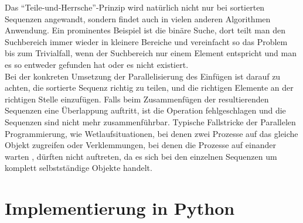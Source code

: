 \par
Das "`Teile-und-Herrsche"'-Prinzip wird natürlich nicht nur bei sortierten Sequenzen angewandt, sondern findet auch in vielen anderen Algorithmen Anwendung. Ein prominentes Beispiel ist die binäre Suche, dort teilt man den Suchbereich immer wieder in kleinere Bereiche und vereinfacht so das Problem bis zum Trivialfall, wenn der Suchbereich nur einem Element entspricht und man es so entweder gefunden hat oder es nicht existiert.
\\
Bei der konkreten Umsetzung der Parallelisierung des Einfügen ist darauf zu achten, die sortierte Sequenz richtig zu teilen, und die richtigen Elemente an der richtigen Stelle einzufügen. Falls beim Zusammenfügen der resultierenden Sequenzen eine Überlappung auftritt, ist die Operation fehlgeschlagen und die Sequenzen sind nicht mehr zusammenführbar. Typische Fallstricke der Parallelen Programmierung, wie Wetlaufsituationen, bei denen zwei Prozesse auf das gleiche Objekt zugreifen oder Verklemmungen, bei denen die Prozesse auf einander warten \cite{Boles:08}, dürften nicht auftreten, da es sich bei den einzelnen Sequenzen um komplett selbstständige Objekte handelt.

\chapter{Implementierung in Python}
\label{chapter:implementierung}

